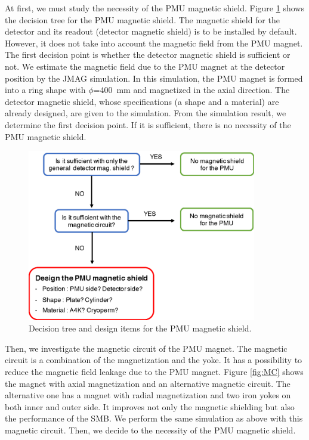 \documentclass[11pt]{article}
\begin{document}
At first, we must study the necessity of the PMU magnetic shield.
Figure \ref{fig:DT} shows the decision tree for the PMU magnetic shield.
The magnetic shield for the detector and its readout (detector magnetic shield) is to be installed by default.
However, it does not take into account the magnetic field from the PMU magnet.
The first decision point is whether the detector magnetic shield is sufficient or not.
We estimate the magnetic field due to the PMU magnet at the detector position by the JMAG simulation.
In this simulation,  the PMU magnet is formed into a ring shape with $\phi$=400~mm and magnetized in the axial direction.
The detector magnetic shield, whose specifications (a shape and a material) are already designed, are given to the simulation.
From the simulation result, we determine the first decision point.
If it is sufficient, there is no necessity of the PMU magnetic shield.

\begin{figure}[htbp]
  \centering
  \includegraphics[width=100mm]{figs/MagShieldDecisionTree.eps}
  \caption{Decision tree and design items for the PMU magnetic shield.}
  \label{fig:DT}
\end{figure}

Then, we investigate the magnetic circuit of the PMU magnet.
The magnetic circuit is a combination of the magnetization and the yoke.
It has a possibility to reduce the magnetic field leakage due to the PMU magnet.
Figure \ref{fig:MC} shows the magnet with axial magnetization and an alternative magnetic circuit.
The alternative one has a magnet with radial magnetization and two iron yokes on both inner and outer side.
It improves not only the magnetic shielding but also the performance of the SMB.
We perform the same simulation as above with this magnetic circuit.
Then, we decide to the necessity of the PMU magnetic shield.
\end{document}
